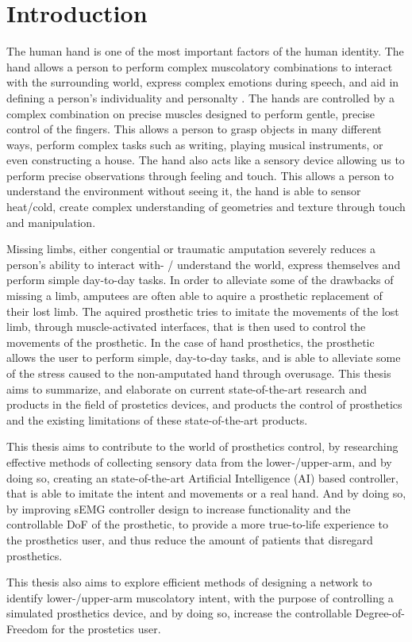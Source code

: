\documentclass[../main.tex]{subfiles}
\begin{document}
\section{Introduction}

The human hand is one of the most important factors of the human identity.
The hand allows a person  to perform complex muscolatory combinations to interact with the surrounding world, express complex emotions during speech, and aid in defining a person's individuality and personalty \cite{???}.
The hands are controlled by a complex combination on precise muscles designed to perform gentle, precise control of the fingers.
This allows a person to grasp objects in many different ways, perform complex tasks such as writing, playing musical instruments, or even constructing a house.
The hand also acts like a sensory device allowing us to perform precise observations through feeling and touch.
This allows a person to understand the environment without seeing it, the hand is able to sensor heat/cold, create complex understanding of geometries and texture through touch and manipulation.

Missing limbs, either \gls{congential} or \gls{traumatic} amputation severely reduces a person's ability to interact with- / understand the world, express themselves and perform simple day-to-day tasks.
In order to alleviate some of the drawbacks of missing a limb, amputees are often able to aquire a prosthetic replacement of their lost limb.
The aquired prosthetic tries to imitate the movements of the lost limb, through muscle-activated interfaces, that is then used to control the movements of the prosthetic. 
In the case of hand prosthetics, the prosthetic allows the user to perform simple, day-to-day tasks, and is able to alleviate some of the stress caused to the non-amputated hand through overusage.
This thesis aims to summarize, and elaborate on current state-of-the-art research and products in the field of prostetics devices, and products the control of prosthetics and the existing limitations of these state-of-the-art products. 

This thesis aims to contribute to the world of prosthetics control, by researching effective methods of collecting sensory data from the lower-/upper-arm, and by doing so, creating an state-of-the-art Artificial Intelligence (AI) based controller, that is able to imitate the intent and movements or a real hand.
And by doing so, by improving sEMG controller design to increase functionality and the controllable DoF of the prosthetic, to provide a more true-to-life experience to the prosthetics user, and thus reduce the amount of patients that disregard prosthetics.

This thesis also aims to explore efficient methods of designing a network to identify lower-/upper-arm muscolatory intent, with the purpose of controlling a simulated prosthetics device, and by doing so, increase the controllable Degree-of-Freedom for the prostetics user.
\end{document}
